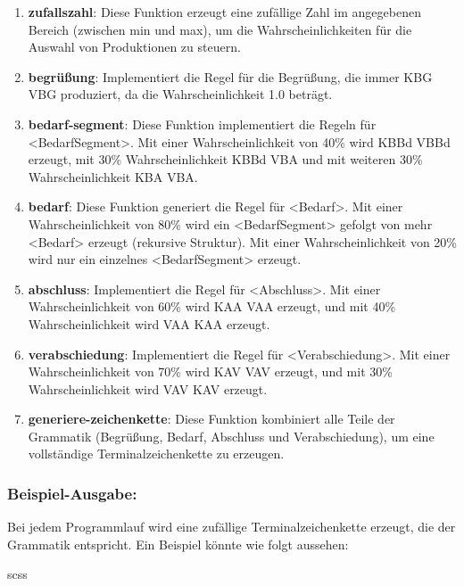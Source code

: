\documentclass[
]{article}
\begin{document}
\begin{enumerate}
\def\labelenumi{\arabic{enumi}.}
\item
  \textbf{zufallszahl}: Diese Funktion erzeugt eine zufällige Zahl im
  angegebenen Bereich (zwischen min und max), um die
  Wahrscheinlichkeiten für die Auswahl von Produktionen zu steuern.
\item
  \textbf{begrüßung}: Implementiert die Regel für die Begrüßung, die
  immer KBG VBG produziert, da die Wahrscheinlichkeit 1.0 beträgt.
\item
  \textbf{bedarf-segment}: Diese Funktion implementiert die Regeln für
  \textless BedarfSegment\textgreater. Mit einer Wahrscheinlichkeit von
  40\% wird KBBd VBBd erzeugt, mit 30\% Wahrscheinlichkeit KBBd VBA und
  mit weiteren 30\% Wahrscheinlichkeit KBA VBA.
\item
  \textbf{bedarf}: Diese Funktion generiert die Regel für
  \textless Bedarf\textgreater. Mit einer Wahrscheinlichkeit von 80\%
  wird ein \textless BedarfSegment\textgreater{} gefolgt von mehr
  \textless Bedarf\textgreater{} erzeugt (rekursive Struktur). Mit einer
  Wahrscheinlichkeit von 20\% wird nur ein einzelnes
  \textless BedarfSegment\textgreater{} erzeugt.
\item
  \textbf{abschluss}: Implementiert die Regel für
  \textless Abschluss\textgreater. Mit einer Wahrscheinlichkeit von 60\%
  wird KAA VAA erzeugt, und mit 40\% Wahrscheinlichkeit wird VAA KAA
  erzeugt.
\item
  \textbf{verabschiedung}: Implementiert die Regel für
  \textless Verabschiedung\textgreater. Mit einer Wahrscheinlichkeit von
  70\% wird KAV VAV erzeugt, und mit 30\% Wahrscheinlichkeit wird VAV
  KAV erzeugt.
\item
  \textbf{generiere-zeichenkette}: Diese Funktion kombiniert alle Teile
  der Grammatik (Begrüßung, Bedarf, Abschluss und Verabschiedung), um
  eine vollständige Terminalzeichenkette zu erzeugen.
\end{enumerate}

\subsubsection{\texorpdfstring{\textbf{Beispiel-Ausgabe:}}{Beispiel-Ausgabe:}}\label{beispiel-ausgabe-1}

Bei jedem Programmlauf wird eine zufällige Terminalzeichenkette erzeugt,
die der Grammatik entspricht. Ein Beispiel könnte wie folgt aussehen:

scss
\end{document}
